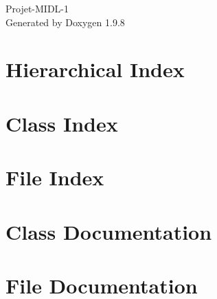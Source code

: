 \documentclass[twoside]{book}
\newcommand{\+}{\discretionary{\mbox{\scriptsize$\hookleftarrow$}}{}{}}
\newcommand{\clearemptydoublepage}{%
    \newpage{\pagestyle{empty}\cleardoublepage}%
  }
\begin{document}
  \raggedbottom
    \hypersetup{pageanchor=false,
                bookmarksnumbered=true,
                pdfencoding=unicode
               }
  \begin{titlepage}
  \vspace*{7cm}
  \begin{center}%
  {\Large Projet-\/\+MIDL-\/1}\\
  \vspace*{1cm}
  {\large Generated by Doxygen 1.9.8}\\
  \end{center}
  \end{titlepage}
  \clearemptydoublepage
  \tableofcontents
  \clearemptydoublepage
  \hypersetup{pageanchor=true}

\chapter{Hierarchical Index}

\chapter{Class Index}

\chapter{File Index}

\chapter{Class Documentation}
















\chapter{File Documentation}


  \backmatter
  \newpage
  \clearemptydoublepage
  \printindex
\end{document}

